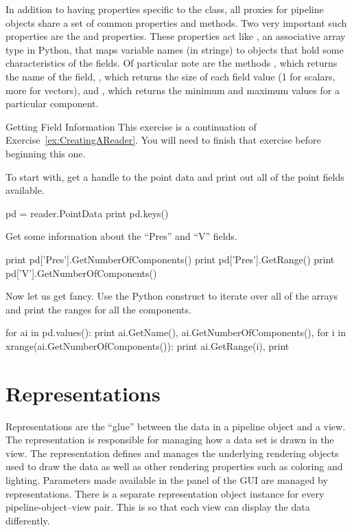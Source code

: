 In addition to having properties specific to the class, all proxies for
pipeline objects share a set of common properties and methods.  Two very
important such properties are the  and
 properties.  These properties act like
, an associative array type in Python, that maps
variable names (in strings) to  objects that
hold some characteristics of the fields.  Of particular note are the
 methods , which returns the
name of the field, , which returns the size
of each field value (1 for scalars, more for vectors), and
, which returns the minimum and maximum values for a
particular component.

\begin{exercise}{Getting Field Information}
  \label{ex:GettingFieldInformation}%
  This exercise is a continuation of Exercise~\ref{ex:CreatingAReader}.
  You will need to finish that exercise before beginning this one.

  To start with, get a handle to the point data and print out all of the
  point fields available.
  \begin{python}
pd = reader.PointData
print pd.keys()
  \end{python}

  Get some information about the ``Pres'' and ``V'' fields.
  \begin{python}
print pd['Pres'].GetNumberOfComponents()
print pd['Pres'].GetRange()
print pd['V'].GetNumberOfComponents()
  \end{python}

  Now let us get fancy.  Use the Python  construct to iterate
  over all of the arrays and print the ranges for all the components.
  \begin{python}
for ai in pd.values():
    print ai.GetName(), ai.GetNumberOfComponents(),
    for i in xrange(ai.GetNumberOfComponents()):
        print ai.GetRange(i),
    print
  \end{python}
\end{exercise}


\section{Representations}
\label{sec:Representations}

Representations are the ``glue'' between the data in a pipeline object and
a view.  The representation is responsible for managing how a data set is
drawn in the view.  The representation defines and manages the underlying
rendering objects used to draw the data as well as other rendering
properties such as coloring and lighting.  Parameters made available in the
 panel of the GUI are managed by representations.  There is a
separate representation object instance for every pipeline-object--view
pair.  This is so that each view can display the data differently.


